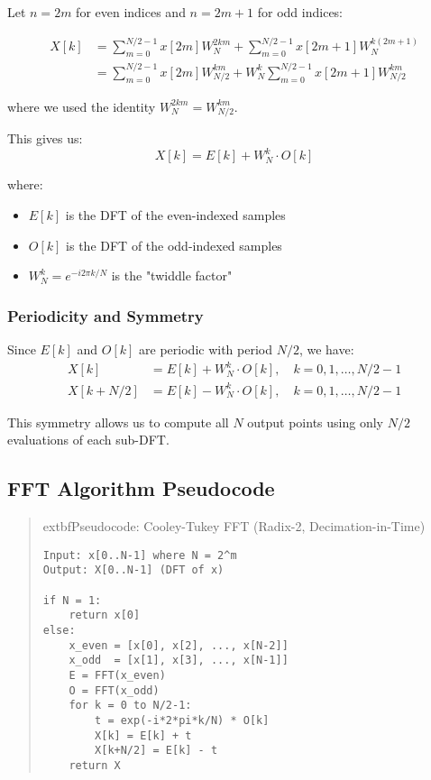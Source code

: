 \documentclass[11pt,a4paper]{article}
\begin{document}
Let $n = 2m$ for even indices and $n = 2m+1$ for odd indices:

\begin{align}
X[k] &= \sum_{m=0}^{N/2-1} x[2m] W_N^{2km} + \sum_{m=0}^{N/2-1} x[2m+1] W_N^{k(2m+1)} \\
&= \sum_{m=0}^{N/2-1} x[2m] W_{N/2}^{km} + W_N^k \sum_{m=0}^{N/2-1} x[2m+1] W_{N/2}^{km}
\end{align}

where we used the identity $W_N^{2km} = W_{N/2}^{km}$.

This gives us:
\begin{equation}
X[k] = E[k] + W_N^k \cdot O[k]
\end{equation}

where:
\begin{itemize}
    \item $E[k]$ is the DFT of the even-indexed samples
    \item $O[k]$ is the DFT of the odd-indexed samples
    \item $W_N^k = e^{-i2\pi k/N}$ is the "twiddle factor"
\end{itemize}

\subsubsection{Periodicity and Symmetry}

Since $E[k]$ and $O[k]$ are periodic with period $N/2$, we have:
\begin{align}
X[k] &= E[k] + W_N^k \cdot O[k], \quad k = 0, 1, \ldots, N/2-1 \\
X[k + N/2] &= E[k] - W_N^k \cdot O[k], \quad k = 0, 1, \ldots, N/2-1
\end{align}

This symmetry allows us to compute all $N$ output points using only $N/2$ evaluations of each sub-DFT.

\subsection{FFT Algorithm Pseudocode}


\begin{quote}
	extbf{Pseudocode: Cooley-Tukey FFT (Radix-2, Decimation-in-Time)}

\begin{verbatim}
Input: x[0..N-1] where N = 2^m
Output: X[0..N-1] (DFT of x)

if N = 1:
    return x[0]
else:
    x_even = [x[0], x[2], ..., x[N-2]]
    x_odd  = [x[1], x[3], ..., x[N-1]]
    E = FFT(x_even)
    O = FFT(x_odd)
    for k = 0 to N/2-1:
        t = exp(-i*2*pi*k/N) * O[k]
        X[k] = E[k] + t
        X[k+N/2] = E[k] - t
    return X
\end{verbatim}
\end{quote}
\end{document}
